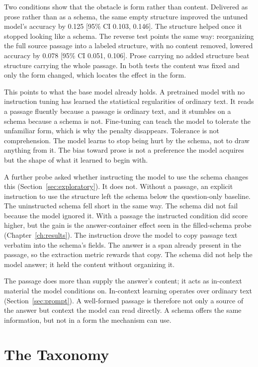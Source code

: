 \documentclass[master]{thesis}
\newcommand{\cref}[1]{Chapter~\ref{#1}}  %
\newcommand{\sref}[1]{Section~\ref{#1}}  %
\begin{document}
Two conditions show that the obstacle is form rather than content. Delivered as prose rather than as a schema, the same empty structure improved the untuned model's accuracy by 0.125 [95\% CI 0.103, 0.146]. The structure helped once it stopped looking like a schema. The reverse test points the same way: reorganizing the full source passage into a labeled structure, with no content removed, lowered accuracy by 0.078 [95\% CI 0.051, 0.106]. Prose carrying no added structure beat structure carrying the whole passage. In both tests the content was fixed and only the form changed, which locates the effect in the form.

This points to what the base model already holds. A pretrained model with no instruction tuning has learned the statistical regularities of ordinary text. It reads a passage fluently because a passage is ordinary text, and it stumbles on a schema because a schema is not. Fine-tuning can teach the model to tolerate the unfamiliar form, which is why the penalty disappears. Tolerance is not comprehension. The model learns to stop being hurt by the schema, not to draw anything from it. The bias toward prose is not a preference the model acquires but the shape of what it learned to begin with.

A further probe asked whether instructing the model to use the schema changes this (\sref{sec:exploratory}). It does not. Without a passage, an explicit instruction to use the structure left the schema below the question-only baseline. The uninstructed schema fell short in the same way. The schema did not fail because the model ignored it. With a passage the instructed condition did score higher, but the gain is the answer-container effect seen in the filled-schema probe (\cref{ch:results}). The instruction drove the model to copy passage text verbatim into the schema's fields. The answer is a span already present in the passage, so the extraction metric rewards that copy. The schema did not help the model answer; it held the content without organizing it.

The passage does more than supply the answer's content; it acts as in-context material the model conditions on. In-context learning operates over ordinary text (\sref{sec:prompt}). A well-formed passage is therefore not only a source of the answer but context the model can read directly. A schema offers the same information, but not in a form the mechanism can use.

\section{The Taxonomy}
\end{document}
